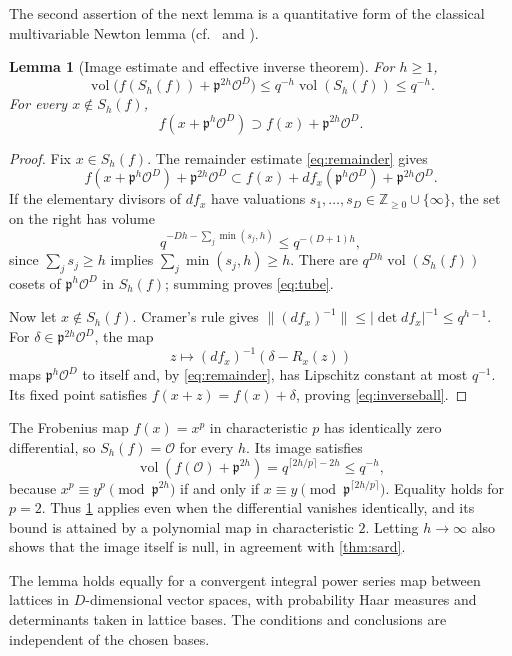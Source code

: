 \documentclass[11pt,reqno]{amsart}
\numberwithin{equation}{section}
\theoremstyle{plain}
\newtheorem{lemma}[theorem]{Lemma}
\theoremstyle{definition}
\theoremstyle{remark}
\theoremstyle{plain}
\newcommand{\Z}{\mathbb{Z}}      %
\newcommand{\OO}{\mathcal{O}}    %
\newcommand{\pp}{\mathfrak{p}}   %
\newcommand{\abs}[1]{\lvert#1\rvert}
\newcommand{\norm}[1]{\lVert#1\rVert}
\DeclareMathOperator{\vol}{vol}
\begin{document}
The second assertion of the next lemma is a quantitative form of the
classical multivariable Newton lemma (cf.\ \cite[\S3, Lemma~2]{MR0207700} and
\cite[Theorem~2.2.1 and Corollary~2.2.1]{MR1743467}).

\begin{lemma}[Image estimate and effective inverse theorem]\label{lem:tube}
For $h\ge1$,
\begin{equation}\label{eq:tube}
\vol\bigl(f(S_h(f))+\pp^{2h}\OO^D\bigr)
\le q^{-h}\vol(S_h(f))\le q^{-h}.
\end{equation}
For every $x\notin S_h(f)$,
\begin{equation}\label{eq:inverseball}
f(x+\pp^h\OO^D)\supset f(x)+\pp^{2h}\OO^D.
\end{equation}
\end{lemma}

\begin{proof}
Fix $x\in S_h(f)$. The remainder estimate \eqref{eq:remainder} gives
\[
f(x+\pp^h\OO^D)+\pp^{2h}\OO^D
\subset f(x)+df_x(\pp^h\OO^D)+\pp^{2h}\OO^D.
\]
If the elementary divisors of $df_x$ have valuations
$s_1,\dots,s_D\in\Z_{\ge0}\cup\{\infty\}$, the set on the right has volume
\[
q^{-Dh-\sum_j\min(s_j,h)}\le q^{-(D+1)h},
\]
since $\sum_js_j\ge h$ implies $\sum_j\min(s_j,h)\ge h$.
There are $q^{Dh}\vol(S_h(f))$ cosets of $\pp^h\OO^D$ in $S_h(f)$;
summing proves \eqref{eq:tube}.

Now let $x\notin S_h(f)$. Cramer's rule gives
$\norm{(df_x)^{-1}}\le\abs{\det df_x}^{-1}\le q^{h-1}$.
For $\delta\in\pp^{2h}\OO^D$, the map
\[
z\longmapsto(df_x)^{-1}(\delta-R_x(z))
\]
maps $\pp^h\OO^D$ to itself and, by \eqref{eq:remainder}, has
Lipschitz constant at most $q^{-1}$. Its fixed point satisfies
$f(x+z)=f(x)+\delta$, proving \eqref{eq:inverseball}.
\end{proof}

The Frobenius map $f(x)=x^p$ in characteristic $p$ has identically
zero differential, so $S_h(f)=\OO$ for every $h$. Its image satisfies
\[
\vol(f(\OO)+\pp^{2h})=q^{\lceil2h/p\rceil-2h}\le q^{-h},
\]
because $x^p\equiv y^p\pmod{\pp^{2h}}$ if and only if
$x\equiv y\pmod{\pp^{\lceil2h/p\rceil}}$. Equality holds for $p=2$.
Thus \cref{lem:tube} applies even when the differential vanishes
identically, and its bound is attained by a polynomial map in
characteristic $2$. Letting $h\to\infty$ also shows that the image
itself is null, in agreement with \cref{thm:sard}.

The lemma holds equally for a convergent integral power series map
between lattices in $D$-dimensional vector spaces, with probability
Haar measures and determinants taken in lattice bases. The conditions
and conclusions are independent of the chosen bases.
\end{document}
